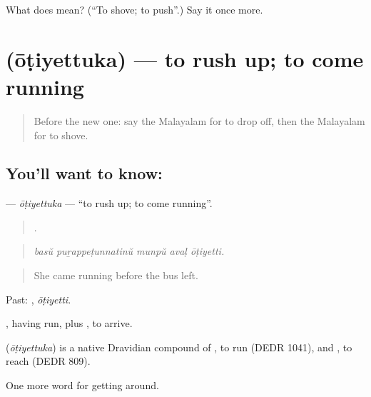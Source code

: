 \begin{tcolorbox}[breakable,colback=teal!4,colframe=teal!35!black,title={Before you move on}]
What does  mean? (\textquotedblleft{}To shove; to push\textquotedblright{}.) Say it once more.
\end{tcolorbox}
\section[\texorpdfstring{\ml{ഓടിയെത്തുക} (ōṭiyettuka)}{ഓടിയെത്തുക (ōṭiyettuka)}]{ (ōṭiyettuka) — to rush up; to come running}

\label{lesson:ML-C473-otiyettuka}



\begin{quote}
Before the new one: say the Malayalam for to drop off, then the Malayalam for to shove.
\end{quote}

\subsection*{You'll want to know: }
\textbf{} — \emph{ōṭiyettuka} — \textquotedblleft{}to rush up; to come running\textquotedblright{}.

\begin{quote}
    .
\end{quote}

\begin{quote}
\emph{basŭ puṟappeṭunnatinŭ munpŭ avaḷ ōṭiyetti.}
\end{quote}

\begin{quote}
She came running before the bus left.
\end{quote}

Past: , \emph{ōṭiyetti}.

, having run, plus , to arrive.

\begin{cousinweb}
\textbf{} (\emph{ōṭiyettuka}) is a native Dravidian compound of , to run (DEDR 1041), and , to reach (DEDR 809).
\end{cousinweb}

\begin{grammarlens}[title={What you've built}]
One more word for getting around.
\end{grammarlens}

